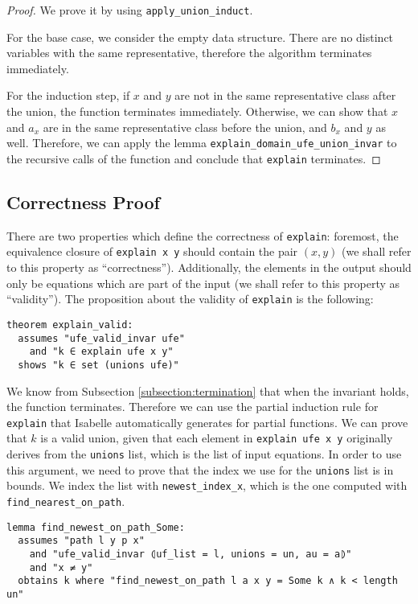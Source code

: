 \begin{proof}
We prove it by using \lstinline|apply_union_induct|.

For the base case, we consider the empty data structure. There are no distinct variables with the same representative, therefore the algorithm terminates immediately.

For the induction step, if $x$ and $y$ are not in the same representative class after the union, the function terminates immediately. Otherwise, we can show that $x$ and $a_x$ are in the same representative class before the union, and $b_x$ and $y$ as well. Therefore, we can apply the lemma \lstinline|explain_domain_ufe_union_invar| to the recursive calls of the function and conclude that \lstinline|explain| terminates.
\end{proof}

\subsection{Correctness Proof}

There are two properties which define the correctness of \lstinline|explain|: foremost, the equivalence closure of \lstinline{explain x y} should contain the pair $(x, y)$ (we shall refer to this property as ``correctness''). Additionally, the elements in the output should only be equations which are part of the input (we shall refer to this property as ``validity''). The proposition about the validity of \lstinline{explain} is the following:

\begin{lstlisting}
theorem explain_valid:
  assumes "ufe_valid_invar ufe"
    and "k ∈ explain ufe x y"
  shows "k ∈ set (unions ufe)"
\end{lstlisting}

We know from Subsection \ref{subsection:termination} that when the invariant holds, the function terminates. Therefore we can use the partial induction rule for \lstinline|explain| that Isabelle automatically generates for partial functions. We can prove that $k$ is a valid union, given that each element in \lstinline|explain ufe x y| originally derives from the \lstinline{unions} list, which is the list of input equations.
In order to use this argument, we need to prove that the index we use for the \lstinline{unions} list is in bounds.
We index the list with \lstinline|newest_index_x|, which is the one computed with \lstinline{find_nearest_on_path}.

\begin{lstlisting}
lemma find_newest_on_path_Some:
  assumes "path l y p x"
    and "ufe_valid_invar ⦇uf_list = l, unions = un, au = a⦈"
    and "x ≠ y"
  obtains k where "find_newest_on_path l a x y = Some k ∧ k < length un"
\end{lstlisting}

